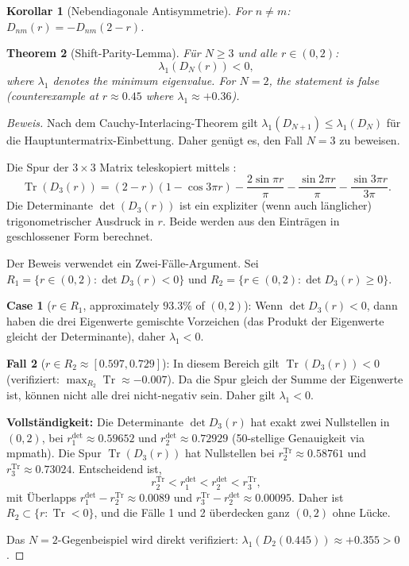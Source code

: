 \documentclass[12pt,a4paper]{article}
\newtheorem{theorem}{Theorem}[section]
\newtheorem{corollary}[theorem]{Korollar}
\theoremstyle{definition}
\theoremstyle{remark}
\begin{document}
\begin{corollary}[Nebendiagonale Antisymmetrie]
\label{cor:antisym}
For $n \neq m$: $D_{nm}(r) = -D_{nm}(2-r)$.
\end{corollary}

\begin{theorem}[Shift-Parity-Lemma]
\label{thm:shift-parity}
Für $N \geq 3$ und alle $r \in (0, 2)$:
\[
  \lambda_1(D_N(r)) < 0,
\]
where $\lambda_1$ denotes the minimum eigenvalue. For $N = 2$, the statement is false (counterexample at $r \approx 0.45$ where $\lambda_1 \approx +0.36$).
\end{theorem}

\begin{proof}[Beweis]
Nach dem Cauchy-Interlacing-Theorem gilt $\lambda_1(D_{N+1}) \leq \lambda_1(D_N)$ für die Hauptuntermatrix-Einbettung. Daher genügt es, den Fall $N = 3$ zu beweisen.

Die Spur der $3 \times 3$ Matrix teleskopiert mittels :
\[
  \operatorname{Tr}(D_3(r)) = (2-r)(1 - \cos 3\pi r) - \frac{2\sin\pi r}{\pi} - \frac{\sin 2\pi r}{\pi} - \frac{\sin 3\pi r}{3\pi}.
\]
Die Determinante $\det(D_3(r))$ ist ein expliziter (wenn auch länglicher) trigonometrischer Ausdruck in $r$. Beide werden aus den Einträgen in geschlossener Form berechnet.

Der Beweis verwendet ein Zwei-Fälle-Argument. Sei $R_1 = \{r \in (0,2) : \det D_3(r) < 0\}$ und $R_2 = \{r \in (0,2) : \det D_3(r) \geq 0\}$.

\medskip
\noindent\textbf{Case 1} ($r \in R_1$, approximately $93.3\%$ of $(0,2)$):
Wenn $\det D_3(r) < 0$, dann haben die drei Eigenwerte gemischte Vorzeichen (das Produkt der Eigenwerte gleicht der Determinante), daher $\lambda_1 < 0$.

\medskip
\noindent\textbf{Fall 2} ($r \in R_2 \approx [0.597, 0.729]$):
In diesem Bereich gilt $\operatorname{Tr}(D_3(r)) < 0$ (verifiziert: $\max_{R_2}\operatorname{Tr} \approx -0.007$). Da die Spur gleich der Summe der Eigenwerte ist, können nicht alle drei nicht-negativ sein. Daher gilt $\lambda_1 < 0$.

\medskip
\noindent\textbf{Vollständigkeit:}
Die Determinante $\det D_3(r)$ hat exakt zwei Nullstellen in $(0,2)$, bei $r_1^{\det} \approx 0.59652$ und $r_2^{\det} \approx 0.72929$ (50-stellige Genauigkeit via mpmath). Die Spur $\operatorname{Tr}(D_3(r))$ hat Nullstellen bei $r_2^{\operatorname{Tr}} \approx 0.58761$ und $r_3^{\operatorname{Tr}} \approx 0.73024$. Entscheidend ist,
\[
  r_2^{\operatorname{Tr}} < r_1^{\det} < r_2^{\det} < r_3^{\operatorname{Tr}},
\]
mit Überlapps $r_1^{\det} - r_2^{\operatorname{Tr}} \approx 0.0089$ und $r_3^{\operatorname{Tr}} - r_2^{\det} \approx 0.00095$.
Daher ist $R_2 \subset \{r : \operatorname{Tr} < 0\}$, und die Fälle 1 und 2 überdecken ganz $(0,2)$ ohne Lücke.

Das $N = 2$-Gegenbeispiel wird direkt verifiziert: $\lambda_1(D_2(0.445)) \approx +0.355 > 0$.
\end{proof}
\end{document}
